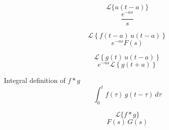 \documentclass[grid, poker_landscape]{flashcards}
\begin{document}
  \begin{flashcard}{ \[ \mathcal{L} \{ u(t - a) \} \] }
    \[
      \frac{e^{-as}}{s}
    \]
  \end{flashcard}

  \begin{flashcard}{ \[ \mathcal{L} 
    \left \{ f(t - a) \, u(t - a) \right \}  \] }
    \[
      e^{-as} F(s)
    \]
  \end{flashcard}

  \begin{flashcard}{ \[ \mathcal{L} 
    \left \{ g(t) \, u(t - a) \right \} \] }
    \[
      e^{-as} \mathcal{L} \left \{ g(t + a) \right \}
    \]
  \end{flashcard}

  

  \begin{flashcard}{ Integral definition of $ f * g $ }
    \[
      \int_0^t f(\tau) \, g(t - \tau) \, d\tau
    \]
  \end{flashcard}

  \begin{flashcard}{ \[ \mathcal{L} \{ f * g \} \] }
    \[
      F(s) \, G(s)
    \]
  \end{flashcard}






\end{document}
